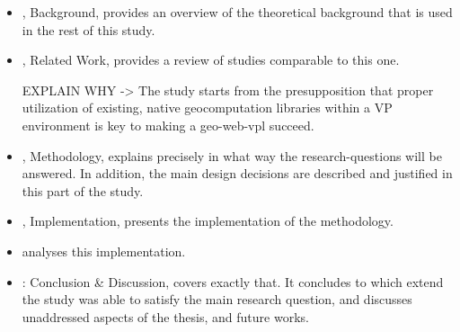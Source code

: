 \begin{itemize}[ ]
  \item {}, Background, provides an overview of the theoretical background that is used in the rest of this study.
  
  \item {}, Related Work, provides a review of studies comparable to this one.
  
  \begin{note}
    EXPLAIN WHY -> The study starts from the presupposition that proper utilization of existing, native geocomputation libraries within a VP environment is key to making a geo-web-vpl succeed. 
  \end{note}

  \item {}, Methodology, explains precisely in what way the research-questions will be answered. In addition, the main design decisions are described and justified in this part of the study.

  \item {}, Implementation, presents the implementation of the methodology.
  
  \item {} analyses this implementation. 
  
  \item {}: Conclusion \& Discussion, covers exactly that. 
  It concludes to which extend the study was able to satisfy the main research question, and discusses unaddressed aspects of the thesis, and future works.

\end{itemize}
